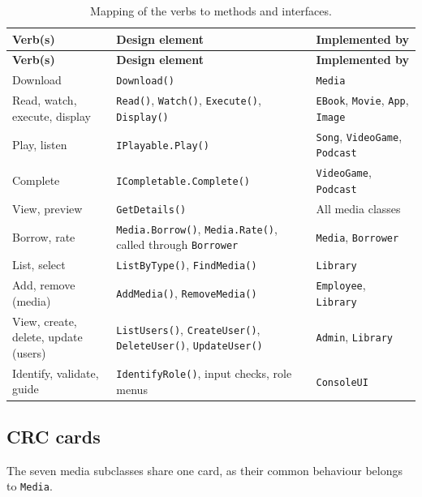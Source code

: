 \renewcommand{\arraystretch}{1.2}
\begin{longtable}{|>{\raggedright\arraybackslash}p{}|>{\raggedright\arraybackslash}p{}|>{\raggedright\arraybackslash}p{}|}
\caption{Mapping of the verbs to methods and interfaces.}\\
\hline
\textbf{Verb(s)} & \textbf{Design element} & \textbf{Implemented by}\\ \hline
\endfirsthead
\hline
\textbf{Verb(s)} & \textbf{Design element} & \textbf{Implemented by}\\ \hline
\endhead
Download & \texttt{Download()} & \texttt{Media}\\ \hline
Read, watch, execute, display & \texttt{Read()}, \texttt{Watch()}, \texttt{Execute()}, \texttt{Display()} & \texttt{EBook}, \texttt{Movie}, \texttt{App}, \texttt{Image}\\ \hline
Play, listen & \texttt{IPlayable.Play()} & \texttt{Song}, \texttt{VideoGame}, \texttt{Podcast}\\ \hline
Complete & \texttt{ICompletable.Complete()} & \texttt{VideoGame}, \texttt{Podcast}\\ \hline
View, preview & \texttt{GetDetails()} & All media classes\\ \hline
Borrow, rate & \texttt{Media.Borrow()}, \texttt{Media.Rate()}, called through \texttt{Borrower} & \texttt{Media}, \texttt{Borrower}\\ \hline
List, select & \texttt{ListByType()}, \texttt{FindMedia()} & \texttt{Library}\\ \hline
Add, remove (media) & \texttt{AddMedia()}, \texttt{RemoveMedia()} & \texttt{Employee}, \texttt{Library}\\ \hline
View, create, delete, update (users) & \texttt{ListUsers()}, \texttt{CreateUser()}, \texttt{DeleteUser()}, \texttt{UpdateUser()} & \texttt{Admin}, \texttt{Library}\\ \hline
Identify, validate, guide & \texttt{IdentifyRole()}, input checks, role menus & \texttt{ConsoleUI}\\ \hline
\end{longtable}
\normalsize

\subsection{CRC cards}

The seven media subclasses share one card, as their common behaviour belongs to \texttt{Media}.

